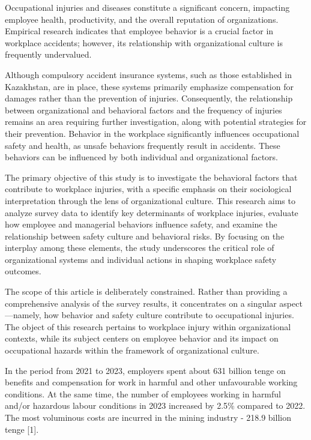 Occupational injuries and diseases constitute a significant concern,
impacting employee health, productivity, and the overall reputation of
organizations. Empirical research indicates that employee behavior is a
crucial factor in workplace accidents; however, its relationship with
organizational culture is frequently undervalued.

Although compulsory accident insurance systems, such as those
established in Kazakhstan, are in place, these systems primarily
emphasize compensation for damages rather than the prevention of
injuries. Consequently, the relationship between organizational and
behavioral factors and the frequency of injuries remains an area
requiring further investigation, along with potential strategies for
their prevention. Behavior in the workplace significantly influences
occupational safety and health, as unsafe behaviors frequently result in
accidents. These behaviors can be influenced by both individual and
organizational factors.

The primary objective of this study is to investigate the behavioral
factors that contribute to workplace injuries, with a specific emphasis
on their sociological interpretation through the lens of organizational
culture. This research aims to analyze survey data to identify key
determinants of workplace injuries, evaluate how employee and managerial
behaviors influence safety, and examine the relationship between safety
culture and behavioral risks. By focusing on the interplay among these
elements, the study underscores the critical role of organizational
systems and individual actions in shaping workplace safety outcomes.

The scope of this article is deliberately constrained. Rather than
providing a comprehensive analysis of the survey results, it
concentrates on a singular aspect---namely, how behavior and safety
culture contribute to occupational injuries. The object of this research
pertains to workplace injury within organizational contexts, while its
subject centers on employee behavior and its impact on occupational
hazards within the framework of organizational culture.

In the period from 2021 to 2023, employers spent about 631 billion tenge
on benefits and compensation for work in harmful and other unfavourable
working conditions. At the same time, the number of employees working in
harmful and/or hazardous labour conditions in 2023 increased by 2.5\%
compared to 2022. The most voluminous costs are incurred in the mining
industry - 218.9 billion tenge {[}1{]}.

